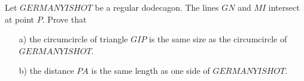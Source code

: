 Let $GERMANYISHOT$ be a regular dodecagon. The lines $GN$ and $MI$ intersect at point $P$. Prove that
\begin{enumerate}
    \item[a)] the circumcircle of triangle $GIP$ is the same size as the circumcircle of
	$GERMANYISHOT$.
    \item[b)] the distance $PA$ is the same length as one side of $GERMANYISHOT$.
\end{enumerate}

